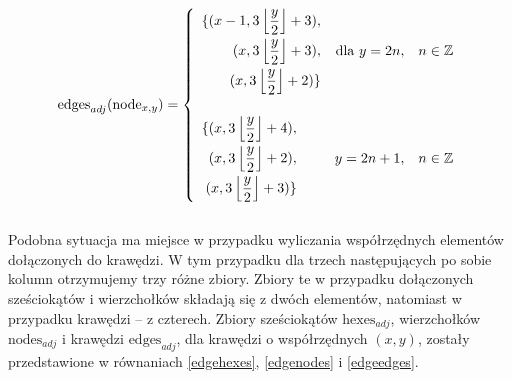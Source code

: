 \documentclass[11pt,twoside]{report}
\begin{document}
\begin{equation}
  \text{edges}_{adj}(\text{node}_{x,y})=
  \left\{
    \begin{array}{l r l}
      \begin{aligned}
      \{
      (x-1, 3\left\lfloor\frac{y}{2}\right\rfloor+3), \\
      (x, 3\left\lfloor\frac{y}{2}\right\rfloor+3), \\
      (x, 3\left\lfloor\frac{y}{2}\right\rfloor+2)
      \}
      \end{aligned} & \mbox{dla } y=2n, & n\in\mathbb{Z} \\[40pt]
      \begin{aligned}
      \{
      (x, 3\left\lfloor\frac{y}{2}\right\rfloor+4), \\
      (x, 3\left\lfloor\frac{y}{2}\right\rfloor+2), \\
      (x, 3\left\lfloor\frac{y}{2}\right\rfloor+3)
      \}
      \end{aligned} & y=2n+1, & n\in\mathbb{Z} \\
    \end{array} \right.
  \label{nodeedges}
\end{equation} \\

Podobna sytuacja ma miejsce w przypadku wyliczania współrzędnych
elementów dołączonych do krawędzi. W tym przypadku dla trzech
następujących po sobie kolumn otrzymujemy trzy różne zbiory. Zbiory te
w przypadku dołączonych sześciokątów i wierzchołków składają się z
dwóch elementów, natomiast w przypadku krawędzi -- z czterech. Zbiory
sześciokątów $\text{hexes}_{adj}$, wierzchołków $\text{nodes}_{adj}$ i
krawędzi $\text{edges}_{adj}$, dla krawędzi o współrzędnych $(x,y)$,
zostały przedstawione w równaniach \ref{edgehexes}, \ref{edgenodes} i
\ref{edgeedges}.
\end{document}
